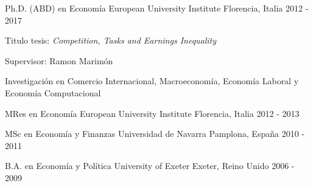 

\begin{cventries}

  \cventry
    {Ph.D. (ABD) en Economía} %
    {European University Institute} %
    {Florencia, Italia} %
    {2012 - 2017} %
    {
        \begin{cvitems} %
            \item {Titulo tesis: \textit{Competition, Tasks and Earnings Inequality}}
            \item {Supervisor: Ramon Marimón}
            \item {Investigación en Comercio Internacional, Macroeconomía, Economía Laboral y Economía Computacional}
        \end{cvitems}
    }

\cventry
    {MRes en Economía} %
    {European University Institute} %
    {Florencia, Italia} %
    {2012 - 2013} %
    {}

\cventry
    {MSc en Economía y Finanzas} %
    {Universidad de Navarra} %
    {Pamplona, España} %
    {2010 - 2011} %
    {}

\cventry
    {B.A. en Economía y Política} %
    {University of Exeter} %
    {Exeter, Reino Unido} %
    {2006 - 2009} %
    {}

\end{cventries}

